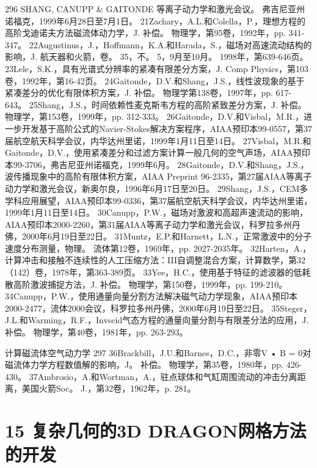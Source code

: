 \documentclass[UTF8,11pt,a4paper,openany,fontset=fandol]{ctexbook}
\begin{document}
296 SHANG, CANUPP \& GAITONDE 等离子动力学和激光会议。 弗吉尼亚州诺福克，1999年6月28日至7月1日。 21Zachary，A.L.和Colella，P.，理想方程的高阶戈迪诺夫方法磁流体动力学，J. 补偿。 物理学，第95卷，1992年，pp. 341-347。 22Augustinus，J.，Hoffmann，K.A.和Harada，S.，磁场对高速流动结构的影响，J. 航天器和火箭，卷。 35，不。 5，9月至10月。 1998年，第639-646页。 23Lele，S.K.，具有光谱式分辨率的紧凑有限差分方案，J. Comp Physics，第103卷，1992年，第16-42页。 24Gaitonde，D.V.和Shang，J.S.，线性波现象的基于紧凑差分的优化有限体积方案，J. 补偿。 物理学第138卷，1997年，pp. 617-643。 25Shang，J.S.，时间依赖性麦克斯韦方程的高阶紧致差分方案，J. 补偿。 物理学，第153卷，1999年，pp. 312-333。 26Gaitonde，D.V.和Visbal，M.R.，进一步开发基于高阶公式的Navier-Stokes解决方案程序，AIAA预印本99-0557，第37届航空航天科学会议，内华达州里诺，1999年1月11日至14日。 27Visbal，M.R.和Gaitonde，D.V.，使用紧凑差分和过滤方案计算一般几何的空气声场，AIAA预印本99-3706，弗吉尼亚州诺福克，1999年6月。 28Gaitonde，D.V.和Shang，J.S.，波传播现象中的高阶有限体积方案，AIAA Preprint 96-2335，第27届AIAA等离子动力学和激光会议，新奥尔良，1996年6月17日至20日。 29Shang，J.S.，CEM多学科应用展望，AIAA预印本99-0336，第37届航空航天科学会议，内华达州里诺，1999年1月11日至14日。 30Canupp，P.W.，磁场对激波和高超声速流动的影响，AIAA预印本2000-2260，第31届AIAA等离子动力学和激光会议，科罗拉多州丹佛，2000年6月19日至22日。 31Muntz，E.P.和Harnett，L.N.，正常激波中的分子速度分布测量，物理。 流体第12卷，1969年，pp. 2027-2035年。 32Harten，A.，计算冲击和接触不连续性的人工压缩方法：III自调整混合方案，计算数学，第32（142）卷，1978年，第363-389页。 33Yee，H.C.，使用基于特征的滤波器的低耗散高阶激波捕捉方法，J. 补偿。 物理学，第150卷，1999年，pp. 199-210。 34Canupp，P.W.，使用通量向量分割方法解决磁气动力学现象，AIAA预印本2000-2477，流体2000会议，科罗拉多州丹佛，2000年6月19日至22日。 35Steger，J.L.和Warming，R.F.，Invscid气态方程的通量向量分割与有限差分法的应用，J. 补偿。 物理学，第40卷，1981年，pp. 263-293。

计算磁流体空气动力学 297 36Brackbill，J.U.和Barnes，D.C.，非零V • B = 0对磁流体力学方程数值解的影响，J。 补偿。 物理学，第35卷，1980年，pp. 426-430。 37Ambrosio，A.和Wortman，A.，驻点球体和气缸周围流动的冲击分离距离，美国火箭Soc。 J.，第32卷，1962年，p. 281。

\clearpage
\chapter{15 复杂几何的3D DRAGON网格方法的开发}
\end{document}
